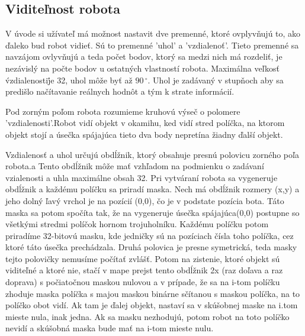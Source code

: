 \subsection{Viditeľnost robota}
V úvode si užívateľ má možnost nastavit dve premenné, ktoré ovplyvňujú to, ako ďaleko bud robot vidieť. Sú to premenné  'uhol' a 'vzdialenoť'. Tieto premenné sa navzájom ovlyvňujú a teda počet bodov, ktorý sa medzi nich má rozdeliť, je nezávislý na počte bodov u ostatných vlastností robota. Maximálna veľkosť \'vzdialenosti\' je 32, uhol môže byť až $90\,^{\circ}$. Uhol je zadávaný v stupňoch aby sa predišlo načítavanie reálnych hodnôt a tým k strate informácií.
\begin{definicia}
Pod zorným poľom robota rozumieme kruhovú výseč o polomere 'vzdialenosti'.Robot vidí objekt v okamihu, ked vidí stred políčka, na ktorom objekt stojí a úsečka spájajúca tieto dva body nepretína žiadny ďalší objekt.
\end{definicia}
Vzdialenosť a uhol určujú obdĺžnik, ktorý obsahuje presnú polovicu zorného poľa robota.a Tento obdĺžnik môže mať vzhľadom na podmienku o zadávaní vzialenosti a uhla maximálne obsah 32. Pri vytváraní robota sa vygeneruje obdĺžnik a každému políčku sa priradí maska. Nech má obdĺžnik rozmery (x,y) a jeho dolný ľavý vrchol je na pozícií (0,0), čo je v podstate pozícia bota. Táto maska sa potom spočíta tak, že na vygeneruje úsečka spájajúca(0,0) postupne so všetkými stredmi políčok hornom trojuholníku. Každému políčku potom priradíme 32-bitovú masku, kde jedničky sú na pozíciach čísla toho políčka, cez ktoré táto úsečka prechádzala. Druhá polovica je presne symetrická, teda masky tejto polovičky nemusíme počítať zvlášť. Potom na zistenie, ktoré objekt sú viditeľné a ktoré nie, stačí v mape prejst tento obdĺžnik 2x (raz doľava a raz doprava) s počiatočnou maskou nulovou a v prípade, že sa na i-tom políčku zhoduje maska políčka s majou maskou binárne sčítanou s maskou políčka, na to políčko obot vidí. Ak tam je ďalej objekt, nastaví sa v skúšobnej maske na i.tom mieste nula, inak jedna. Ak sa masku nezhodujú, potom robot na toto políčko nevidí a skúšobná maska bude mať na i-tom mieste nulu.
\indent
